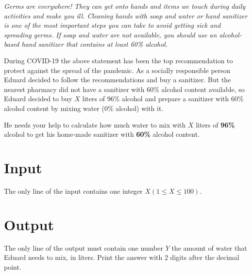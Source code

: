\textit{
Germs are everywhere!
They can get onto hands and items we touch during daily activities and make you ill. Cleaning hands with soap and water or hand sanitizer is one of the most important steps you can take to avoid getting sick and spreading germs.
If soap and water are not available, you should use an alcohol-based hand sanitizer that contains at least 60\% alcohol.
}

During COVID-19 the above statement has been the top recommendation to protect against the spread of the pandemic.
As a socially responsible person Eduard decided to follow the recommendations and buy a sanitizer.
But the nearest pharmacy did not have a sanitizer with 60\% alcohol content available, so Eduard decided to buy $X$ liters of 96\% alcohol and prepare a sanitizer with 60\% alcohol content by mixing water (0\% alcohol) with it.

He needs your help to calculate how much water to mix with $X$ liters of \textbf{96\%} alcohol to get his home-made sanitizer with \textbf{60\%} alcohol content.

\section*{Input}
The only line of the input contains one integer $X (1 \leq X \leq 100)$.

\section*{Output}
The only line of the output must contain one number $Y$ the amount of water that Eduard needs to mix, in liters.
Print the answer with 2 digits after the decimal point.
